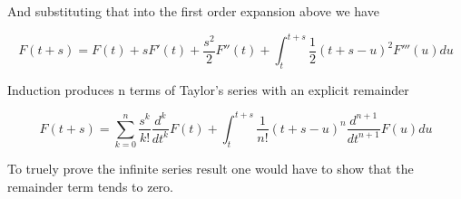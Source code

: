 \documentclass{article}
\begin{document}
And substituting that into the first order expansion above we have

\[
F(t+s) = F(t) + s F'(t) + \frac{s^2}{2} F''(t) + \int_{t}^{t+s} \frac{1}{2}(t+s-u)^2 F'''(u) du
\]

Induction produces n terms of Taylor's series with an explicit remainder

\[
F(t+s) = \sum_{k=0}^{n} \frac{s^k}{k!} \frac{d^k}{dt^k} F(t) +
                        \int_{t}^{t+s} \frac{1}{n!}(t+s-u)^n \frac{d^{n+1}}{dt^{n+1}} F(u) du
\]

To truely prove the infinite series result one would have to show that the remainder term tends to zero.

\end{document}
